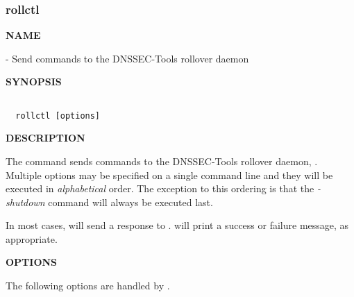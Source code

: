 \clearpage

\subsubsection{rollctl}

{\bf NAME}

 - Send commands to the DNSSEC-Tools rollover daemon

{\bf SYNOPSIS}

\begin{verbatim}

  rollctl [options]

\end{verbatim}

{\bf DESCRIPTION}

The  command sends commands to the DNSSEC-Tools rollover daemon,
.  Multiple options may be specified on a single command line and
they will be executed in {\it alphabetical} order.  The exception to this
ordering is that the {\it -shutdown} command will always be executed last.

In most cases,  will send a response to .
 will print a success or failure message, as appropriate.

{\bf OPTIONS}

The following options are handled by .

